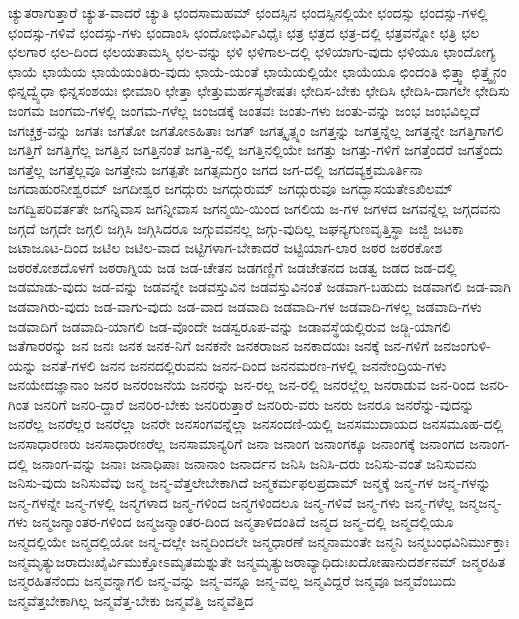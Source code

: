 {ಚ್ಯುತರಾಗುತ್ತಾರೆ
ಚ್ಯುತ-ವಾದರೆ
ಚ್ಯುತಿ
ಛಂದಸಾಮಹಮ್
ಛಂದಸ್ಸಿನ
ಛಂದಸ್ಸಿನಲ್ಲಿಯೇ
ಛಂದಸ್ಸು
ಛಂದಸ್ಸು-ಗಳಲ್ಲಿ
ಛಂದಸ್ಸು-ಗಳಿವೆ
ಛಂದಸ್ಸು-ಗಳು
ಛಂದಾಂಸಿ
ಛಂದೋಭಿರ್ವಿವಿಧೈಃ
ಛತ್ರ
ಛತ್ರದ
ಛತ್ರ-ದಲ್ಲಿ
ಛತ್ರವನ್ನೋ
ಛತ್ರಿ
ಛಲ
ಛಲಗಾರ
ಛಲ-ದಿಂದ
ಛಲಯತಾಮಸ್ಮಿ
ಛಲ-ವನ್ನು
ಛಳಿ
ಛಳಿಗಾಲ-ದಲ್ಲಿ
ಛಳಿಯಾಗು-ವುದು
ಛಳಿಯೂ
ಛಾಂದೋಗ್ಯ
ಛಾಯೆ
ಛಾಯೆಯ
ಛಾಯೆಯಂತಿರು-ವುದು
ಛಾಯೆ-ಯಂತೆ
ಛಾಯೆಯಲ್ಲಿಯೇ
ಛಾಯೆಯೂ
ಛಿಂದಂತಿ
ಛಿತ್ತ್ವಾ
ಛಿತ್ತ್ವೈನಂ
ಛಿನ್ನದ್ವ್ಯೆಧಾ
ಛಿನ್ನಸಂಶಯಃ
ಛೀಮಾರಿ
ಛೇತ್ತಾ
ಛೇತ್ತುಮರ್ಹಸ್ಯಶೇಷತಃ
ಛೇದಿಸ-ಬೇಕು
ಛೇದಿಸಿ
ಛೇದಿಸಿ-ದಾಗಲೇ
ಛೇದಿಸು
ಜಂಗಮ
ಜಂಗಮ-ಗಳಲ್ಲಿ
ಜಂಗಮ-ಗಳೆಲ್ಲ
ಜಂಜಡಕ್ಕೆ
ಜಂತವಃ
ಜಂತು-ಗಳು
ಜಂತು-ವನ್ನು
ಜಂಭ
ಜಂಭವಿಲ್ಲದೆ
ಜಗಚ್ಚಕ್ರ-ವನ್ನು
ಜಗತಃ
ಜಗತೋ
ಜಗತೋಽಹಿತಾಃ
ಜಗತ್
ಜಗತ್ಕೃತ್ಸ್ನಂ
ಜಗತ್ತನ್ನು
ಜಗತ್ತನ್ನೆಲ್ಲ
ಜಗತ್ತನ್ನೇ
ಜಗತ್ತಿಗಾಗಲಿ
ಜಗತ್ತಿಗೆ
ಜಗತ್ತಿಗೆಲ್ಲ
ಜಗತ್ತಿನ
ಜಗತ್ತಿನಂತೆ
ಜಗತ್ತಿ-ನಲ್ಲಿ
ಜಗತ್ತಿನಲ್ಲಿಯೇ
ಜಗತ್ತು
ಜಗತ್ತು-ಗಳಿಗೆ
ಜಗತ್ತೆಂದರೆ
ಜಗತ್ತೆಂದು
ಜಗತ್ತೆಲ್ಲ
ಜಗತ್ತೆಲ್ಲವೂ
ಜಗತ್ತೇನು
ಜಗತ್ಪತೇ
ಜಗತ್ಸಮಗ್ರಂ
ಜಗದ
ಜಗ-ದಲ್ಲಿ
ಜಗದವ್ಯಕ್ತಮೂರ್ತಿನಾ
ಜಗದಾಹುರನೀಶ್ವರಮ್
ಜಗದೀಶ್ವರ
ಜಗದ್ಗುರು
ಜಗದ್ಗುರುಮ್
ಜಗದ್ಗುರುವೂ
ಜಗದ್ಭಾಸಯತೇಽಖಿಲಮ್
ಜಗದ್ವಿಪರಿವರ್ತತೇ
ಜಗನ್ನಿವಾಸ
ಜಗನ್ನೀವಾಸ
ಜಗನ್ಮಯಿ-ಯಿಂದ
ಜಗಲಿಯ
ಜ-ಗಳ
ಜಗಳದ
ಜಗವನ್ನೆಲ್ಲ
ಜಗ್ಗದವನು
ಜಗ್ಗದೆ
ಜಗ್ಗದೇ
ಜಗ್ಗಲಿ
ಜಗ್ಗಿಸಿ
ಜಗ್ಗಿಸಿದರೂ
ಜಗ್ಗುವವನಲ್ಲ
ಜಗ್ಗು-ವುದಿಲ್ಲ
ಜಘನ್ಯಗುಣವೃತ್ತಿಸ್ಥಾ
ಜಜ್ಜಿ
ಜಟಕಾ
ಜಟಾಜೂಟ-ದಿಂದ
ಜಟಿಲ
ಜಟಿಲ-ವಾದ
ಜಟ್ಟಿಗಳಾಗ-ಬೇಕಾದರೆ
ಜಟ್ಟಿಯಾಗ-ಲಾರ
ಜಠರ
ಜಠರಕೋಶ
ಜಠರಕೋಶದೊಳಗೆ
ಜಠರಾಗ್ನಿಯ
ಜಡ
ಜಡ-ಚೇತನ
ಜಡಗಣ್ಣಿಗೆ
ಜಡಚೇತನದ
ಜಡತ್ವ
ಜಡದ
ಜಡ-ದಲ್ಲಿ
ಜಡಮಾಡು-ವುದು
ಜಡ-ವನ್ನು
ಜಡವನ್ನೇ
ಜಡವಸ್ತುವಿನ
ಜಡವಸ್ತುವಿನಂತೆ
ಜಡವಾಗ-ಬಹುದು
ಜಡವಾಗಲಿ
ಜಡ-ವಾಗಿ
ಜಡವಾಗಿರು-ವುದು
ಜಡ-ವಾಗು-ವುದು
ಜಡ-ವಾದ
ಜಡವಾದಿ
ಜಡವಾದಿ-ಗಳ
ಜಡವಾದಿ-ಗಳಲ್ಲ
ಜಡವಾದಿ-ಗಳು
ಜಡವಾದಿಗೆ
ಜಡವಾದಿ-ಯಾಗಲಿ
ಜಡ-ವೊಂದೇ
ಜಡಸ್ವರೂಪ-ವನ್ನು
ಜಡಾವಸ್ಥೆಯಲ್ಲಿರುವ
ಜಡ್ಜಿ-ಯಾಗಲಿ
ಜತೆಗಾರರನ್ನು
ಜನ
ಜನಃ
ಜನಕ
ಜನಕ-ನಿಗೆ
ಜನಕನೇ
ಜನಕರಾಜನ
ಜನಕಾದಯಃ
ಜನಕ್ಕೆ
ಜನ-ಗಳಿಗೆ
ಜನಜಂಗುಳಿ-ಯನ್ನು
ಜನತೆ-ಗಳಲಿ
ಜನನ
ಜನನದಲ್ಲಿರುವನು
ಜನನ-ದಿಂದ
ಜನನಮರಣ-ಗಳಲ್ಲಿ
ಜನನೇಂದ್ರಿಯ-ಗಳು
ಜನಯೇದಜ್ಞಾನಾಂ
ಜನರ
ಜನರಂಜನೆಯ
ಜನರನ್ನು
ಜನ-ರಲ್ಲ
ಜನ-ರಲ್ಲಿ
ಜನರಲ್ಲೆಲ್ಲ
ಜನರಾಡುವ
ಜನ-ರಿಂದ
ಜನರಿ-ಗಿಂತ
ಜನರಿಗೆ
ಜನರಿ-ದ್ದಾರೆ
ಜನರಿರ-ಬೇಕು
ಜನರಿರುತ್ತಾರೆ
ಜನರಿರು-ವರು
ಜನರು
ಜನರೂ
ಜನರೆನ್ನು-ವುದನ್ನು
ಜನರೆಲ್ಲ
ಜನರೆಲ್ಲರ
ಜನರೆಲ್ಲಾ
ಜನರೇ
ಜನಸಂಗವನ್ನೆಲ್ಲಾ
ಜನಸಂದಣಿ-ಯಲ್ಲಿ
ಜನಸಮುದಾಯದ
ಜನಸಮೂಹ-ದಲ್ಲಿ
ಜನಸಾಧಾರಣರು
ಜನಸಾಧಾರಣರೆಲ್ಲ
ಜನಸಾಮಾನ್ಯರಿಗೆ
ಜನಾ
ಜನಾಂಗ
ಜನಾಂಗಕ್ಕೂ
ಜನಾಂಗಕ್ಕೆ
ಜನಾಂಗದ
ಜನಾಂಗ-ದಲ್ಲಿ
ಜನಾಂಗ-ವನ್ನು
ಜನಾಃ
ಜನಾಧಿಪಾಃ
ಜನಾನಾಂ
ಜನಾರ್ದನ
ಜನಿಸಿ
ಜನಿಸಿ-ದರು
ಜನಿಸು-ವಂತೆ
ಜನಿಸುವನು
ಜನಿಸು-ವುದು
ಜನಿಸುವೆವು
ಜನ್ಮ
ಜನ್ಮ-ವೆತ್ತಲೇಬೇಕಾಗಿದೆ
ಜನ್ಮಕರ್ಮಫಲಪ್ರದಾಮ್
ಜನ್ಮಕ್ಕೆ
ಜನ್ಮ-ಗಳ
ಜನ್ಮ-ಗಳನ್ನು
ಜನ್ಮ-ಗಳನ್ನೇ
ಜನ್ಮ-ಗಳಲ್ಲಿ
ಜನ್ಮಗಳಾದ
ಜನ್ಮ-ಗಳಿಂದ
ಜನ್ಮಗಳಿಂದಲೂ
ಜನ್ಮ-ಗಳಿವೆ
ಜನ್ಮ-ಗಳು
ಜನ್ಮ-ಗಳೆಲ್ಲ
ಜನ್ಮಜನ್ಮ-ಗಳು
ಜನ್ಮಜನ್ಮಾಂತರ-ಗಳಿಂದ
ಜನ್ಮಜನ್ಮಾಂತರ-ದಿಂದ
ಜನ್ಮತಾಳಿದಂತಿದೆ
ಜನ್ಮದ
ಜನ್ಮ-ದಲ್ಲಿ
ಜನ್ಮದಲ್ಲಿಯೂ
ಜನ್ಮದಲ್ಲಿಯೇ
ಜನ್ಮದಲ್ಲಿಯೋ
ಜನ್ಮ-ದಲ್ಲೇ
ಜನ್ಮದಿಂದಲೇ
ಜನ್ಮಧಾರಣೆ
ಜನ್ಮನಾಮಂತೇ
ಜನ್ಮನಿ
ಜನ್ಮಬಂಧವಿನಿರ್ಮುಕ್ತಾಃ
ಜನ್ಮಮೃತ್ಯುಜರಾದುಃಖೈರ್ವಿಮುಕ್ತೋಽಮೃತಮಶ್ನುತೇ
ಜನ್ಮಮೃತ್ಯುಜರಾವ್ಯಾಧಿದುಃಖದೋಷಾನುದರ್ಶನಮ್
ಜನ್ಮರಹಿತ
ಜನ್ಮರಹಿತನೆಂದು
ಜನ್ಮವನ್ನಾಗಲಿ
ಜನ್ಮ-ವನ್ನು
ಜನ್ಮ-ವನ್ನೂ
ಜನ್ಮ-ವಲ್ಲ
ಜನ್ಮವಿದ್ದರೆ
ಜನ್ಮವೂ
ಜನ್ಮವೆಂಬುದು
ಜನ್ಮವೆತ್ತಬೇಕಾಗಿಲ್ಲ
ಜನ್ಮವೆತ್ತ-ಬೇಕು
ಜನ್ಮವೆತ್ತಿ
ಜನ್ಮವೆತ್ತಿದ
}
